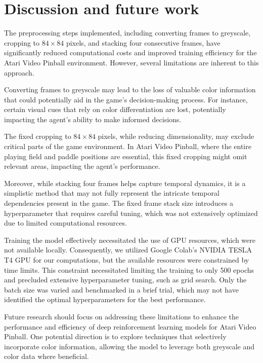 \section{Discussion and future work}
The preprocessing steps implemented, including converting frames to greyscale, cropping to \(84 \times 84\) pixels, and stacking four consecutive frames, have significantly reduced computational costs and improved training efficiency for the Atari Video Pinball environment. However, several limitations are inherent to this approach.

Converting frames to greyscale may lead to the loss of valuable color information that could potentially aid in the game's decision-making process. For instance, certain visual cues that rely on color differentiation are lost, potentially impacting the agent's ability to make informed decisions.

The fixed cropping to \(84 \times 84\) pixels, while reducing dimensionality, may exclude critical parts of the game environment. In Atari Video Pinball, where the entire playing field and paddle positions are essential, this fixed cropping might omit relevant areas, impacting the agent's performance.

Moreover, while stacking four frames helps capture temporal dynamics, it is a simplistic method that may not fully represent the intricate temporal dependencies present in the game. The fixed frame stack size introduces a hyperparameter that requires careful tuning, which was not extensively optimized due to limited computational resources.

Training the model effectively necessitated the use of GPU resources, which were not available locally. Consequently, we utilized Google Colab's NVIDIA TESLA T4 GPU for our computations, but the available resources were constrained by time limits. This constraint necessitated limiting the training to only 500 epochs and precluded extensive hyperparameter tuning, such as grid search. Only the batch size was varied and benchmarked in a brief trial, which may not have identified the optimal hyperparameters for the best performance.



Future research should focus on addressing these limitations to enhance the performance and efficiency of deep reinforcement learning models for Atari Video Pinball. One potential direction is to explore techniques that selectively incorporate color information, allowing the model to leverage both greyscale and color data where beneficial. 

